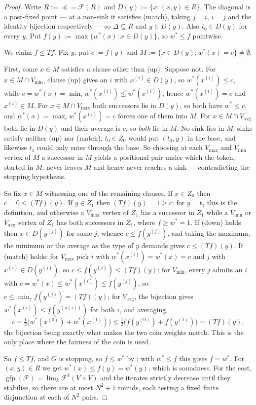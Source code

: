 \documentclass[11pt]{article}
\theoremstyle{plain}
\theoremstyle{definition}
\newcommand{\Vmax}{V_{\max}}
\newcommand{\Vmin}{V_{\min}}
\newcommand{\Vavg}{V_{\mathrm{avg}}}
\begin{document}
\begin{proof}
Write $R:=\preceq=\mathcal{F}(R)$ and $D(y):=\{x:(x,y)\in R\}$. The
diagonal is a post-fixed point --- at a non-sink it satisfies (match),
taking $j=i$, $i=j$ and the identity bijection respectively --- so
$\Delta\subseteq R$ and $y\in D(y)$. Also $t_0\in D(y)$ for every $y$.
Put $f(y):=\max\{w^\ast(x):x\in D(y)\}$, so $w^\ast\le f$ pointwise.

We claim $f\le Tf$. Fix $y$, put $c:=f(y)$ and
$M:=\{x\in D(y):w^\ast(x)=c\}\ne\emptyset$.

First, some $x\in M$ satisfies a clause other than (up). Suppose not.
For $x\in M\cap\Vmin$, clause (up) gives an $i$ with $x^{(i)}\in D(y)$,
so $w^\ast(x^{(i)})\le c$, while
$c=w^\ast(x)=\min_i w^\ast(x^{(i)})\le w^\ast(x^{(i)})$; hence
$w^\ast(x^{(i)})=c$ and $x^{(i)}\in M$. For $x\in M\cap\Vmax$ both
successors lie in $D(y)$, so both have $w^\ast\le c$, and
$w^\ast(x)=\max_i w^\ast(x^{(i)})=c$ forces one of them into $M$. For
$x\in M\cap\Vavg$ both lie in $D(y)$ and their average is $c$, so
\emph{both} lie in $M$. No sink lies in $M$: sinks satisfy neither (up)
nor (match), $t_0\in Z_0$ would put $(t_0,y)$ in the base, and likewise
$t_1$ could only enter through the base. So choosing at each $\Vmax$ and
$\Vmin$ vertex of $M$ a successor in $M$ yields a positional pair under
which the token, started in $M$, never leaves $M$ and hence never reaches
a sink --- contradicting the stopping hypothesis.

So fix $x\in M$ witnessing one of the remaining clauses. If $x\in Z_0$
then $c=0\le(Tf)(y)$. If $y\in Z_1$ then $(Tf)(y)=1\ge c$: for $y=t_1$
this is the definition, and otherwise a $\Vmax$ vertex of $Z_1$ has a
successor in $Z_1$ while a $\Vmin$ or $\Vavg$ vertex of $Z_1$ has both
successors in $Z_1$, where $f\ge w^\ast=1$. If (down) holds then
$x\in D(y^{(j)})$ for some $j$, whence $c\le f(y^{(j)})$, and taking the
maximum, the minimum or the average as the type of $y$ demands gives
$c\le(Tf)(y)$. If (match) holds: for $\Vmax$ pick $i$ with
$w^\ast(x^{(i)})=w^\ast(x)=c$ and $j$ with $x^{(i)}\in D(y^{(j)})$, so
$c\le f(y^{(j)})\le(Tf)(y)$; for $\Vmin$, every $j$ admits an $i$ with
$c=w^\ast(x)\le w^\ast(x^{(i)})\le f(y^{(j)})$, so $c\le\min_j
f(y^{(j)})=(Tf)(y)$; for $\Vavg$, the bijection gives
$w^\ast(x^{(i)})\le f(y^{(\pi(i))})$ for both $i$, and averaging,
\[
  c=\tfrac12\bigl(w^\ast(x^{(0)})+w^\ast(x^{(1)})\bigr)
   \le\tfrac12\bigl(f(y^{(0)})+f(y^{(1)})\bigr)=(Tf)(y),
\]
the bijection being exactly what makes the two coin weights match. This
is the only place where the fairness of the coin is used.

So $f\le Tf$, and $G$ is stopping, so $f\le w^\ast$ by
; with $w^\ast\le f$ this gives $f=w^\ast$. For
$(x,y)\in R$ we get $w^\ast(x)\le f(y)=w^\ast(y)$, which is soundness.
For the cost, $\operatorname{gfp}(\mathcal{F})=\lim_k\mathcal{F}^k(V\times V)$
and the iterates strictly decrease until they stabilise, so there are at
most $N^{2}+1$ rounds, each testing a fixed finite disjunction at each of
$N^{2}$ pairs.
\end{proof}
\end{document}
